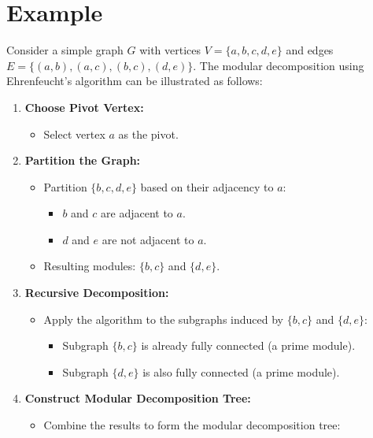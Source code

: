 \section{Example}\label{sec:example}

Consider a simple graph $G$ with vertices $V = \{a, b, c, d, e\}$ and edges $E = \{(a, b), (a, c), (b, c), (d, e)\}$.
The modular decomposition using Ehrenfeucht's algorithm can be illustrated as follows:

\begin{enumerate}
    \item \textbf{Choose Pivot Vertex:}
    \begin{itemize}
        \item Select vertex $a$ as the pivot.
    \end{itemize}
    \item \textbf{Partition the Graph:}
    \begin{itemize}
        \item Partition $\{b, c, d, e\}$ based on their adjacency to $a$:
        \begin{itemize}
            \item $b$ and $c$ are adjacent to $a$.
            \item $d$ and $e$ are not adjacent to $a$.
        \end{itemize}
        \item Resulting modules: $\{b, c\}$ and $\{d, e\}$.
    \end{itemize}
    \item \textbf{Recursive Decomposition:}
    \begin{itemize}
        \item Apply the algorithm to the subgraphs induced by $\{b, c\}$ and $\{d, e\}$:
        \begin{itemize}
            \item Subgraph $\{b, c\}$ is already fully connected (a prime module).
            \item Subgraph $\{d, e\}$ is also fully connected (a prime module).
        \end{itemize}
    \end{itemize}
    \item \textbf{Construct Modular Decomposition Tree:}
    \begin{itemize}
        \item Combine the results to form the modular decomposition tree:
    \end{itemize}
\end{enumerate}


